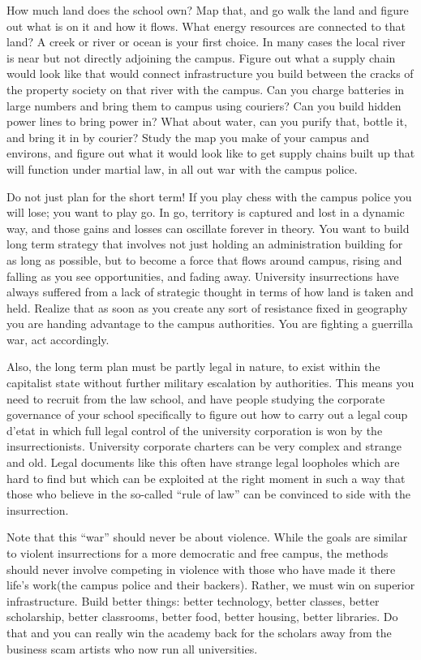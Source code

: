 How much land does the school own? Map that, and go walk the land and
figure out what is on it and how it flows. What energy resources are
connected to that land? A creek or river or ocean is your first choice.
In many cases the local river is near but not directly adjoining the
campus. Figure out what a supply chain would look like that would
connect infrastructure you build between the cracks of the property
society on that river with the campus. Can you charge batteries in large
numbers and bring them to campus using couriers? Can you build hidden
power lines to bring power in? What about water, can you purify that,
bottle it, and bring it in by courier? Study the map you make of your
campus and environs, and figure out what it would look like to get
supply chains built up that will function under martial law, in all out
war with the campus police.

Do not just plan for the short term! If you play chess with the campus
police you will lose; you want to play go. In go, territory is captured
and lost in a dynamic way, and those gains and losses can oscillate
forever in theory. You want to build long term strategy that involves
not just holding an administration building for as long as possible, but
to become a force that flows around campus, rising and falling as you
see opportunities, and fading away. University insurrections have always
suffered from a lack of strategic thought in terms of how land is taken
and held. Realize that as soon as you create any sort of resistance
fixed in geography you are handing advantage to the campus authorities.
You are fighting a guerrilla war, act accordingly.

Also, the long term plan must be partly legal in nature, to exist within
the capitalist state without further military escalation by authorities.
This means you need to recruit from the law school, and have people
studying the corporate governance of your school specifically to figure
out how to carry out a legal coup d'etat in which full legal control of
the university corporation is won by the insurrectionists. University
corporate charters can be very complex and strange and old. Legal
documents like this often have strange legal loopholes which are hard to
find but which can be exploited at the right moment in such a way that
those who believe in the so-called ``rule of law'' can be convinced to
side with the insurrection.

Note that this ``war'' should never be about violence. While the goals
are similar to violent insurrections for a more democratic and free
campus, the methods should never involve competing in violence with
those who have made it there life's work(the campus police and their
backers). Rather, we must win on superior infrastructure. Build better
things: better technology, better classes, better scholarship, better
classrooms, better food, better housing, better libraries. Do that and
you can really win the academy back for the scholars away from the
business scam artists who now run all universities.

